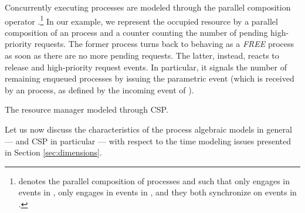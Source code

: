 Concurrently executing processes are modeled through the parallel
composition operator .\footnote{  denotes the parallel composition of processes
   and  such that  only
  engages in events in ,  only engages in events in
  , and they both synchronize on events in .} In our
example, we represent the occupied resource by a parallel composition
of an  process and a counter  counting
the number of pending high-priority requests. The former process turns
back to behaving as a \textsl{FREE} process as soon as there are no
more pending requests.  The latter, instead, reacts to release and
high-priority request events. In particular, it signals the number of
remaining enqueued processes by issuing the parametric event
 (which is received by an  process,
as defined by the incoming event  of
).

\begin{table}[tbh]
\begin{center}
  
\end{center}
\caption{The resource manager modeled through CSP.}
\label{tab:untimedCSP}
\end{table}

Let us now discuss the characteristics of the process algebraic 
models in general --- and CSP in particular --- with respect to 
the time modeling issues presented in Section \ref{sec:dimensions}. 

